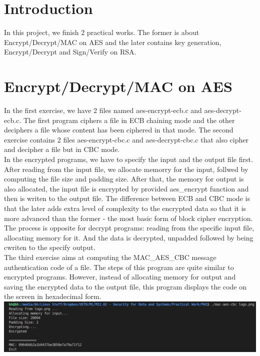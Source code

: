 \documentclass{article}
\begin{document}
\section{Introduction}
In this project, we finish 2 practical works. The former is about Encrypt/Decrypt/MAC on AES and the later contains key generation, Encrypt/Decrypt and Sign/Verify on RSA. 
\\

\section{Encrypt/Decrypt/MAC on AES}
In the first exercise, we have 2 files named aes-encrypt-ecb.c and aes-decrypt-ecb.c. The first program ciphers a file in ECB chaining mode and the other deciphers a file whose content has been ciphered in that mode. The second exercise contains 2 files aes-encrypt-cbc.c and aes-decrypt-cbc.c that also cipher and decipher a file but in CBC mode.
\\

In the encrypted programs, we have to specify the input and the output file first. After reading from the input file, we allocate memorry for the input, follwed by computing the file size and padding size. After that, the memory for output is also allocated, the input file is encrypted by provided aes\_encrypt function and then is writen to the output file. The difference between ECB and CBC mode is that the later adds extra level of complexity to the encrypted data so that it is more advanced than the former - the most basic form of block cipher encryption.
\\

The process is opposite for decrypt programs: reading from the specific input file, allocating memory for it. And the data is decrypted, unpadded followed by being cwriten to the specify output. 
\\

The third exercise aims at computing the MAC\_AES\_CBC message authentication code of a file. The steps of this program are quite similar to encrypted programs. However, instead of allocating memory for output and saving the encrypted data to the output file, this program displays the code on the screen in hexadecimal form.
\\


\includegraphics[width=\linewidth]{macoutput}
\\ 
\end{document}
